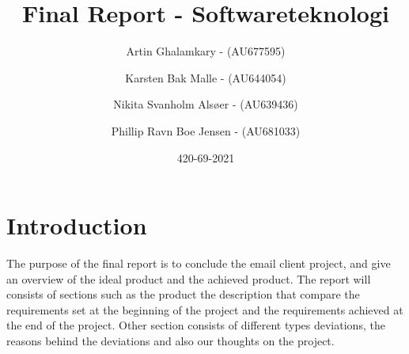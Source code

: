 \documentclass{article}
\title{Final Report - Softwareteknologi} %
\author{Artin Ghalamkary - (AU677595) \and Karsten Bak Malle - (AU644054) \and Nikita Svanholm Alsøer - (AU639436) \and Phillip Ravn Boe Jensen - (AU681033)}%
\date{420-69-2021}
\begin{document}
\maketitle

\section*{Introduction} 
The purpose of the final report is to conclude the email client project, and give an overview of the ideal product and the achieved product. The report will consists of sections such as the product the description that compare the requirements set at the beginning of the project and the requirements achieved at the end of the project. Other section consists of different types deviations, the reasons behind the deviations and also our thoughts on the project. 
\end{document}
